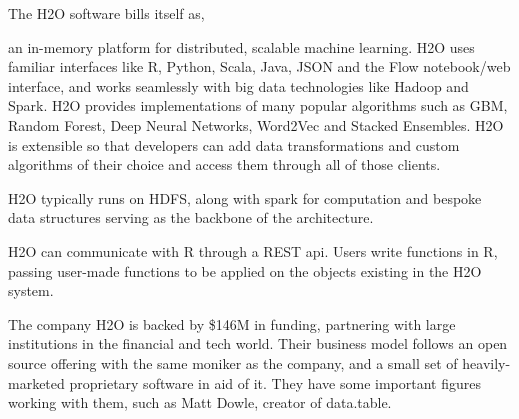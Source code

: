 The H2O software bills itself as,

\begin{displayquote}
    an in-memory platform for distributed, scalable machine learning. H2O
    uses familiar interfaces like R, Python, Scala, Java, JSON and the Flow
    notebook/web interface, and works seamlessly with big data technologies
    like Hadoop and Spark. H2O provides implementations of many popular
    algorithms such as GBM, Random Forest, Deep Neural Networks, Word2Vec
    and Stacked Ensembles. H2O is extensible so that developers can add data
    transformations and custom algorithms of their choice and access them
    through all of those clients.
\end{displayquote}

H2O typically runs on HDFS, along with spark for computation and bespoke
data structures serving as the backbone of the architecture.

H2O can communicate with R through a REST api. Users write functions in
R, passing user-made functions to be applied on the objects existing in
the H2O system\cite{h2o.ai:_h2o}.

The company H2O is backed by \$146M in funding, partnering with large
institutions in the financial and tech world. Their business model
follows an open source offering with the same moniker as the company,
and a small set of heavily-marketed proprietary software in aid of it.
They have some important figures working with them, such as Matt Dowle,
creator of data.table.